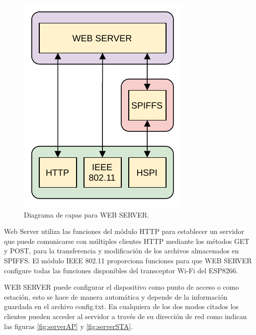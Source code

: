 \begin{figure}[h]
	\centering
	\includegraphics[scale=1]{./Figures/web_server_diagram.pdf}
	\caption{Diagrama de capas para WEB SERVER.}
		\label{fig:serverDiagram}
\end{figure}

Web Server utiliza las funciones del módulo HTTP para establecer un servidor que puede comunicarse con múltiples clientes HTTP mediante los métodos GET y POST, para la transferencia y modificación de los archivos almacenados en SPIFFS. El módulo IEEE 802.11 proporciona funciones para que WEB SERVER configure todas las funciones disponibles del transceptor Wi-Fi del ESP8266.

WEB SERVER puede configurar el dispositivo como punto de acceso o como estación, esto se hace de manera automática y depende de la información guardada en el archivo config.txt. En cualquiera de los dos modos citados los clientes pueden acceder al servidor a través de su dirección de red como indican las figuras \ref{fig:serverAP} y \ref{fig:serverSTA}.                                                                                                                                                                                                                                                                                                                                                                                                                                                                                                                                                                                                                                                                                                                                                                                                                                                                                                                                                                                                                                                                          

